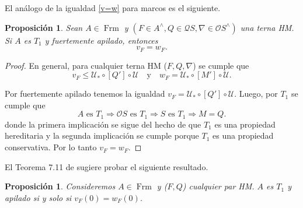 \documentclass[12pt]{article}
\newtheorem{prop}[thm]{Proposición}
\DeclareMathOperator{\Frm}{Frm}
\begin{document}
El análogo de la igualdad \eqref{v=w} para marcos es el siguiente. 

\begin{prop}\label{fapiladoT1}
Sean $A\in \Frm$ y $(F\in A^\wedge,Q \in \mathcal{Q}S, \nabla\in \mathcal{O}S^\wedge)$ una terna HM.
Si $A$ es $T_1$ y fuertemente apilado, entonces
\[
v_F=w_F.
\]
\end{prop}

\begin{proof}
En general, para cualquier terna HM ($F, Q, \nabla$) se cumple que 
\[
v_F\leq \mathcal{U}_*\circ [Q']\circ \mathcal{U}\quad \text{y}\quad w_F=\mathcal{U}_*\circ [M']\circ \mathcal{U}.
\]

Por fuertemente apilado tenemos la igualdad $v_F=\mathcal{U}_*\circ [Q']\circ \mathcal{U}$. Luego, por $T_1$ se cumple que
\[
A\text{ es }T_1\Rightarrow \mathcal{O}S\text{ es }T_1\Rightarrow S \text{ es }T_1\Rightarrow M=Q.
\]
donde la primera implicación se sigue del hecho de que $T_1$ es una propiedad hereditaria y la segunda implicación se cumple porque $T_1$ es una propiedad conservativa. 
Por lo tanto $v_F=w_F$.
\end{proof}

El Teorema 7.11 de \cite{simmons2004vietoris} sugiere probar el siguiente resultado.

\begin{prop}\label{focales}
Consideremos $A\in \Frm$ y ($F, Q$) cualquier par HM. $A$ es $T_1$ y apilado si y solo si $v_F(0)=w_F(0)$.
\end{prop}
\end{document}
